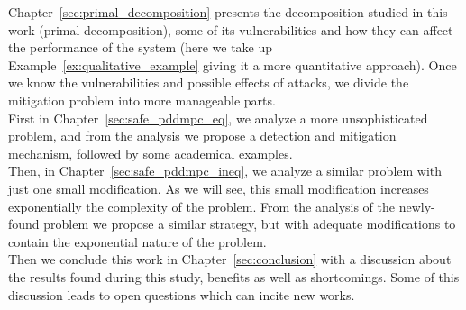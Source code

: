 \documentclass[../main.tex]{subfiles}
\begin{document}
Chapter~\ref{sec:primal_decomposition} presents the decomposition studied in this work (primal decomposition), some of its vulnerabilities and how they can affect the performance of the system (here we take up Example~\ref{ex:qualitative_example} giving it a more quantitative approach).
Once we know the vulnerabilities and possible effects of attacks, we divide the mitigation problem into more manageable parts.
\\ First in Chapter~\ref{sec:safe_pddmpc_eq}, we analyze a more unsophisticated problem, and from the analysis we propose a detection and mitigation mechanism, followed by some academical examples.
\\Then, in Chapter~\ref{sec:safe_pddmpc_ineq}, we analyze a similar problem with just one small modification. As we will see, this small modification increases exponentially the complexity of the problem.
From the analysis of the newly-found problem we propose a similar strategy, but with adequate modifications to contain the exponential nature of the problem.
\\Then we conclude this work in Chapter~\ref{sec:conclusion} with a discussion about the results found during this study, benefits as well as shortcomings. Some of this discussion leads to open questions which can incite new works.

\end{document}
